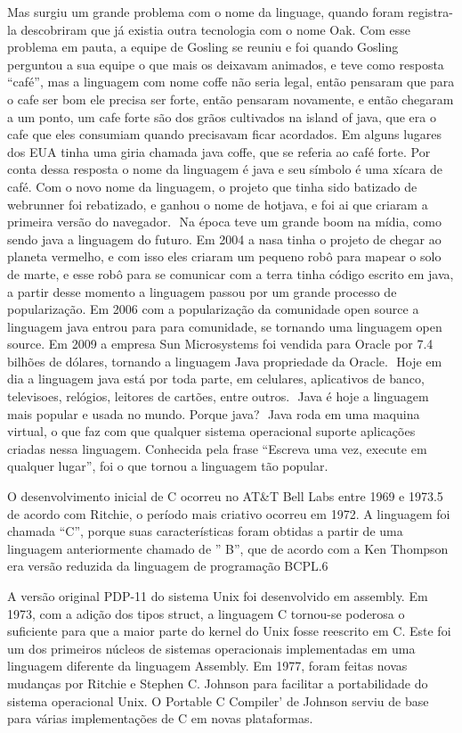 \documentclass[
    12pt,               %
    openright,          %
    twoside,            %
    a4paper,            %
    brazil              %
    ]{abntex2}
\begin{document}
Mas surgiu um grande problema com o nome da linguage, quando foram registra-la
descobriram que já existia outra tecnologia com o nome Oak. Com esse problema
em pauta, a equipe de Gosling se reuniu e foi quando Gosling perguntou a sua
equipe o que mais os deixavam animados, e teve como resposta “café”, mas a
linguagem com nome coffe não seria legal, então pensaram que para o cafe ser
bom ele precisa ser forte, então pensaram novamente, e então chegaram a um
ponto, um cafe forte são dos grãos cultivados na island of java, que era o cafe
que eles consumiam quando precisavam ficar acordados. Em alguns lugares dos EUA
tinha uma giria chamada java coffe, que se referia ao café forte. Por conta
dessa resposta o nome da linguagem é java e seu símbolo é uma xícara de café.
Com o novo nome da linguagem, o projeto que tinha sido batizado de webrunner
foi rebatizado, e ganhou o nome de hotjava, e foi ai que criaram a primeira
versão do navegador.  Na época teve um grande boom na mídia, como sendo java a
linguagem do futuro.  Em 2004 a nasa tinha o projeto de chegar ao planeta
vermelho, e com isso eles criaram um pequeno robô para mapear o solo de marte,
e esse robô para se comunicar com a terra tinha código escrito em java, a
partir desse momento a linguagem passou por um grande processo de
popularização.  Em 2006 com a popularização da comunidade open source a
linguagem java entrou para para comunidade, se tornando uma linguagem open
source.  Em 2009 a empresa Sun Microsystems foi vendida para Oracle por 7.4
bilhões de dólares, tornando a linguagem Java propriedade da Oracle.  Hoje em
dia a linguagem java está por toda parte, em celulares, aplicativos de banco,
televisoes, relógios, leitores de cartões, entre outros.  Java é hoje a
linguagem mais popular e usada no mundo.  Porque java?  Java roda em uma
maquina virtual, o que faz com que qualquer sistema operacional suporte
aplicações criadas nessa linguagem. Conhecida pela frase “Escreva uma vez,
execute em qualquer lugar”, foi o que tornou a linguagem tão popular.

O desenvolvimento inicial de C ocorreu no AT&T Bell Labs entre 1969 e 1973.5 de 
acordo com Ritchie, o período mais criativo ocorreu em 1972. A linguagem foi chamada 
“C”, porque suas características foram obtidas a partir de uma linguagem anteriormente 
chamado de ” B”, que de acordo com a Ken Thompson era versão reduzida da linguagem de 
programação BCPL.6

A versão original PDP-11 do sistema Unix foi desenvolvido em assembly. Em 1973, com a 
adição dos tipos struct, a linguagem C tornou-se poderosa o suficiente para que a 
maior parte do kernel do Unix fosse reescrito em C. Este foi um dos primeiros núcleos 
de sistemas operacionais implementadas em uma linguagem diferente da linguagem Assembly. 
Em 1977, foram feitas novas mudanças por Ritchie e Stephen C. Johnson para facilitar a 
portabilidade do sistema operacional Unix. O Portable C Compiler’ de Johnson serviu de 
base para várias implementações de C em novas plataformas.
\end{document}
